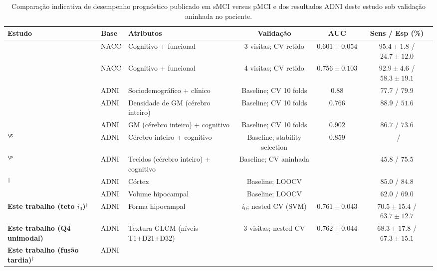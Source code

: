 \documentclass[review]{elsarticle}
\begin{document}
\begin{table}
	\centering
	\footnotesize
	\setlength{\tabcolsep}{4pt}
	\renewcommand{\arraystretch}{1.15}
	\caption{Comparação indicativa de desempenho prognóstico publicado em sMCI versus pMCI e dos resultados ADNI deste estudo sob validação aninhada no paciente.}
	\label{tab:literature_comparison}
	\begin{tabular}{@{}lllccc@{}}
		\toprule
		\textbf{Estudo} & \textbf{Base} & \textbf{Atributos} &
		\textbf{Validação} & \textbf{AUC} & \textbf{Sens / Esp (\%)} \\
		\midrule
		\citet{bucholc-2023} & NACC &
		Cognitivo + funcional &
		3 visitas; CV retido &
		$0.601 \pm 0.054$ & $95.4 \pm 1.8$ / $24.7 \pm 12.0$ \\
		\citet{bucholc-2023} & NACC &
		Cognitivo + funcional &
		4 visitas; CV retido &
		$0.756 \pm 0.103$ & $92.9 \pm 4.6$ / $58.3 \pm 19.1$ \\
		\citet{grassi-2019} & ADNI &
		Sociodemográfico + clínico &
		Baseline; CV 10 folds &
		$0.88$ & $77.7$ / $79.9$ \\
		\citet{moradi-2015} & ADNI &
		Densidade de GM (cérebro inteiro) &
		Baseline; CV 10 folds &
		$0.766$ & $88.9$ / $51.6$ \\
		\citet{moradi-2015} & ADNI &
		GM (cérebro inteiro) + cognitivo &
		Baseline; CV 10 folds &
		$0.902$ & $86.7$ / $73.6$ \\
		\citet{ye-2012}$^{\S}$ & ADNI &
		Cérebro inteiro + cognitivo &
		Baseline; stability selection &
		$0.859$ & \textemdash\ / \textemdash \\
		\citet{casanova-2013}$^{\P}$ & ADNI &
		Tecidos (cérebro inteiro) + cognitivo &
		Baseline; CV aninhada &
		\textemdash & $45.8$ / $75.5$ \\
		\citet{guo-2017a}$^{\|}$ & ADNI &
		Córtex &
		Baseline; LOOCV &
		\textemdash & $85.0$ / $84.8$ \\
		\citet{cuingnet-2011} & ADNI &
		Volume hipocampal &
		Baseline; LOOCV &
		\textemdash & $62.0$ / $69.0$ \\
		\midrule
		\textbf{Este trabalho (teto $i_0$)}$^{\dagger}$ & ADNI &
		Forma hipocampal &
		$i_0$; nested CV (SVM) &
		$\mathbf{0.761 \pm 0.043}$ & $\mathbf{70.5 \pm 15.4}$ / $\mathbf{63.7 \pm 12.7}$ \\
		\textbf{Este trabalho (Q4 unimodal)} & ADNI &
		Textura GLCM (níveis T1+D21+D32) &
		3 visitas; nested CV &
		$\mathbf{0.762 \pm 0.044}$ & $\mathbf{68.3 \pm 17.8}$ / $\mathbf{67.3 \pm 15.1}$ \\
		\textbf{Este trabalho (fusão tardia)}$^{\ddagger}$ & ADNI &

\end{tabular}
\end{table}
\end{document}
